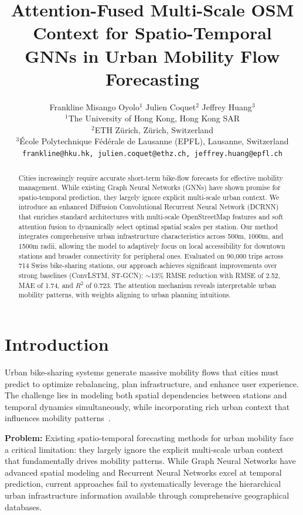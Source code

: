 \documentclass{article}
\title{Attention-Fused Multi-Scale OSM Context for Spatio-Temporal GNNs in Urban Mobility Flow Forecasting}
\author{
  Frankline Misango Oyolo$^1$ \quad Julien Coquet$^2$ \quad Jeffrey Huang$^3$ \\
  $^1$The University of Hong Kong, Hong Kong SAR \\
  $^2$ETH Zürich, Zürich, Switzerland \\
  $^3$École Polytechnique Fédérale de Lausanne (EPFL), Lausanne, Switzerland \\
  \texttt{frankline@hku.hk, julien.coquet@ethz.ch, jeffrey.huang@epfl.ch}
}
\begin{document}
\maketitle

\begin{abstract}
Cities increasingly require accurate short-term bike-flow forecasts for effective mobility management. While existing Graph Neural Networks (GNNs) have shown promise for spatio-temporal prediction, they largely ignore explicit multi-scale urban context. We introduce an enhanced Diffusion Convolutional Recurrent Neural Network (DCRNN) that enriches standard architectures with multi-scale OpenStreetMap features and soft attention fusion to dynamically select optimal spatial scales per station. Our method integrates comprehensive urban infrastructure characteristics across 500m, 1000m, and 1500m radii, allowing the model to adaptively focus on local accessibility for downtown stations and broader connectivity for peripheral ones. Evaluated on 90,000 trips across 714 Swiss bike-sharing stations, our approach achieves significant improvements over strong baselines (ConvLSTM, ST-GCN): $\sim$13\% RMSE reduction with RMSE of 2.52, MAE of 1.74, and $R^2$ of 0.723. The attention mechanism reveals interpretable urban mobility patterns, with weights aligning to urban planning intuitions.
\end{abstract}

\section{Introduction}

Urban bike-sharing systems generate massive mobility flows that cities must predict to optimize rebalancing, plan infrastructure, and enhance user experience. The challenge lies in modeling both spatial dependencies between stations and temporal dynamics simultaneously, while incorporating rich urban context that influences mobility patterns~\cite{li2018}.

\textbf{Problem:} Existing spatio-temporal forecasting methods for urban mobility face a critical limitation: they largely ignore the explicit multi-scale urban context that fundamentally drives mobility patterns. While Graph Neural Networks have advanced spatial modeling and Recurrent Neural Networks excel at temporal prediction, current approaches fail to systematically leverage the hierarchical urban infrastructure information available through comprehensive geographical databases.
\end{document}
